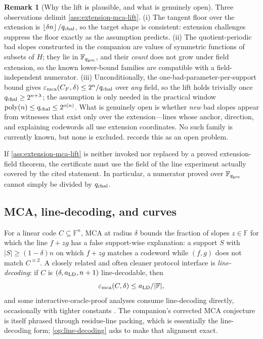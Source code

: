 \documentclass[11pt]{article}
\theoremstyle{definition}
\newtheorem{remark}[theorem]{Remark}
\newcommand{\F}{\mathbb F}
\newcommand{\poly}{\operatorname{poly}}
\newcommand{\mca}{\varepsilon_{\rm mca}}
\newcommand{\qgen}{q_{\rm gen}}
\newcommand{\qchal}{q_{\rm chal}}
\newcommand{\Int}[2]{#1^{\equiv #2}}
\newcommand{\floor}[1]{\left\lfloor #1\right\rfloor}
\begin{document}
\begin{remark}[Why the lift is plausible, and what is genuinely open]
\label{rem:lift-evidence}
Three observations delimit \cref{ass:extension-mca-lift}.  (i) The tangent floor over the extension is $\floor{\delta n}/\qchal$, so the target shape is consistent: extension challenges suppress the floor exactly as the assumption predicts.  (ii) The quotient-periodic bad slopes constructed in the companion are values of symmetric functions of subsets of $H$; they lie in $\F_{\qgen}$, and their \emph{count} does not grow under field extension, so the known lower-bound families are compatible with a field-independent numerator.  (iii) Unconditionally, the one-bad-parameter-per-support bound gives $\mca(C_F,\delta)\le2^{n}/\qchal$ over \emph{any} field, so the lift holds trivially once $\qchal\ge2^{n+\lambda}$; the assumption is only needed in the practical window $\poly(n)\le\qchal\le2^{o(n)}$.  What is genuinely open is whether \emph{new} bad slopes appear from witnesses that exist only over the extension---lines whose anchor, direction, and explaining codewords all use extension coordinates.  No such family is currently known, but none is excluded.   records this as an open problem.
\end{remark}

If \cref{ass:extension-mca-lift} is neither invoked nor replaced by a proved extension-field theorem, the certificate must use the field of the line experiment actually covered by the cited statement.  In particular, a numerator proved over $\F_{\qgen}$ cannot simply be divided by $\qchal$.

\subsection{MCA, line-decoding, and curves}
\label{sec:mca-objects}

For a linear code $C\subseteq\F^n$, MCA at radius $\delta$ bounds the fraction of slopes $z\in\F$ for which the line $f+zg$ has a false support-wise explanation: a support $S$ with $|S|\ge(1-\delta)n$ on which $f+zg$ matches a codeword while $(f,g)$ does not match $\Int{C}{2}$.  A closely related and often cleaner protocol interface is \emph{line-decoding}: if $C$ is $(\delta,a_{\rm LD},n+1)$ line-decodable, then
\[
        \mca(C,\delta)\le a_{\rm LD}/|\F| ,
\]
and some interactive-oracle-proof analyses consume line-decoding directly, occasionally with tighter constants \cite{GG25,Hab24,Hab25,ABF26}.  The companion's corrected MCA conjecture is itself phrased through residue-line packing, which is essentially the line-decoding form; \cref{op:line-decoding} asks to make that alignment exact.
\end{document}
